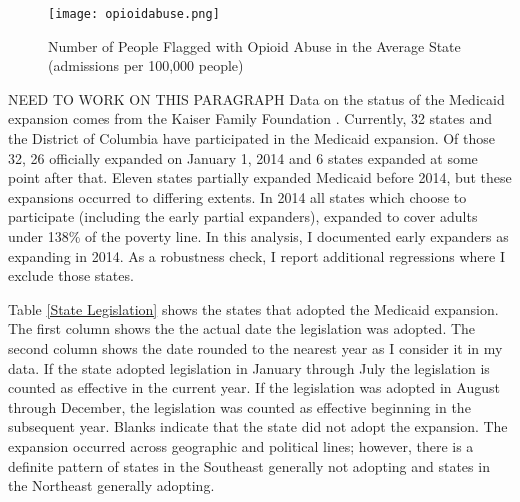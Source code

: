 \documentclass[11pt]{article}
\begin{document}
\begin{figure} 
\begin{center}
  \texttt{[image: opioidabuse.png]}
  \caption{Number of People Flagged with Opioid Abuse in the Average State (admissions per 100,000 people)}
  \label{Abuse}
  \end{center}
\end{figure}

\cleardoublepage



NEED TO WORK ON THIS PARAGRAPH
Data on the status of the Medicaid expansion comes from the Kaiser Family Foundation \citep{TheHenryJ.KaiserFamilyFoundation2017}.  Currently, 32 states and the District of Columbia have participated in the Medicaid expansion.  Of those 32, 26 officially expanded on January 1, 2014 and 6 states expanded at some point after that. Eleven states partially expanded Medicaid before 2014, but these expansions occurred to differing extents.  In 2014 all states which choose to participate (including the early partial expanders), expanded to cover adults under 138\% of the poverty line.  In this analysis, I documented early expanders as expanding in 2014.  As a robustness check, I report additional regressions where I exclude those states.  

Table \ref{State Legislation} shows the states that adopted the Medicaid expansion.  The first column shows the the actual date the legislation was adopted.  The second column shows the date rounded to the nearest year as I consider it in my data. If the state adopted legislation in January through July the legislation is counted as effective in the current year.  If the legislation was adopted in August through December, the legislation was counted as effective beginning in the subsequent year. Blanks indicate that the state did not adopt the expansion. The expansion occurred across geographic and political lines; however, there is a definite pattern of states in the Southeast generally not adopting and states in the Northeast generally adopting.   

\cleardoublepage
\end{document}
